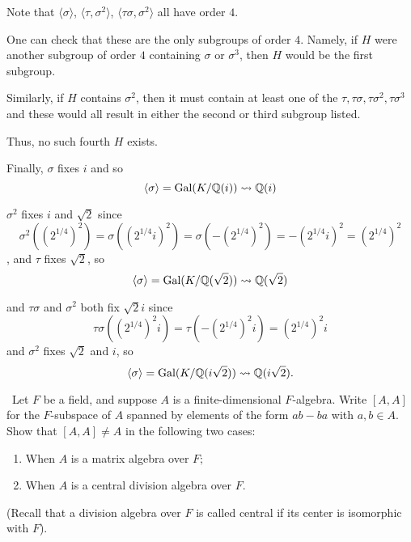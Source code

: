 \documentclass[12pt]{Qual}
\begin{document}
\begin{solution}
Note that $\langle\sigma\rangle$, $\langle\tau,\sigma^2\rangle$, $\langle \tau\sigma,\sigma^2\rangle$ all have order $4$.

One can check that these are the only subgroups of order $4$. Namely, if $H$ were another subgroup of order $4$ containing $\sigma$ or $\sigma^3$, then $H$ would be the first subgroup.

Similarly, if $H$ contains $\sigma^2$, then it must contain at least one of the $\tau,\tau\sigma,\tau\sigma^2,\tau\sigma^3$ and these would all result in either the second or third subgroup listed.

Thus, no such fourth $H$ exists.

Finally, $\sigma$ fixes $i$ and so $$\langle\sigma\rangle=\text{Gal}(K/\mathbb{Q}(i))\leadsto \mathbb{Q}(i)$$

$\sigma^2$ fixes $i$ and $\sqrt{2}$ since $$\sigma^2((2^{1/4})^2)=\sigma((2^{1/4}i)^2)=\sigma(-(2^{1/4})^2)=-(2^{1/4}i)^2=(2^{1/4})^2$$, and $\tau$ fixes $\sqrt{2}$, so $$\langle\sigma\rangle=\text{Gal}(K/\mathbb{Q}(\sqrt{2}))\leadsto \mathbb{Q}(\sqrt{2})$$

and $\tau\sigma$ and $\sigma^2$ both fix $\sqrt{2}i$ since $$\tau\sigma((2^{1/4})^2i)=\tau(-(2^{1/4})^2i)=(2^{1/4})^2i$$ and $\sigma^2$ fixes $\sqrt{2}$ and $i$, so $$\langle\sigma\rangle=\text{Gal}(K/\mathbb{Q}(i\sqrt{2}))\leadsto \mathbb{Q}(i\sqrt{2}).$$
\end{solution}
\newpage



\begin{problem} $\,$
Let $F$ be a field, and suppose $A$ is a finite-dimensional $F$-algebra. Write $[A,A]$ for the $F$-subspace of $A$ spanned by elements of the form $ab-ba$ with $a,b\in A$. Show that $[A,A]\not=A$ in the following two cases:
\begin{enumerate}[label=(\alph*)]
    \item When $A$ is a matrix algebra over $F;$
    \item When $A$ is a central division algebra over $F.$
\end{enumerate} (Recall that a division algebra over $F$ is called central if its center is isomorphic with $F$).
\end{problem}
\end{document}
